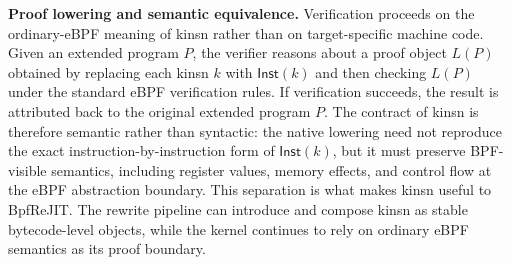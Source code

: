 

\noindent\textbf{Proof lowering and semantic equivalence.} Verification proceeds on the ordinary-eBPF meaning of kinsn rather than on target-specific machine code. Given an extended program $P$, the verifier reasons about a proof object $L(P)$ obtained by replacing each kinsn $k$ with $\mathsf{Inst}(k)$ and then checking $L(P)$ under the standard eBPF verification rules. If verification succeeds, the result is attributed back to the original extended program $P$. The contract of kinsn is therefore semantic rather than syntactic: the native lowering need not reproduce the exact instruction-by-instruction form of $\mathsf{Inst}(k)$, but it must preserve BPF-visible semantics, including register values, memory effects, and control flow at the eBPF abstraction boundary. This separation is what makes kinsn useful to BpfReJIT. The rewrite pipeline can introduce and compose kinsn as stable bytecode-level objects, while the kernel continues to rely on ordinary eBPF semantics as its proof boundary.
